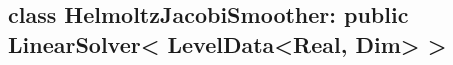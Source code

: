 \documentclass[cn, bibend=bibtex]{elegantpaper}
\theoremstyle{plain}
\begin{document}



\subsection{class HelmoltzJacobiSmoother: public LinearSolver< LevelData<Real, Dim> >}
\end{document}
